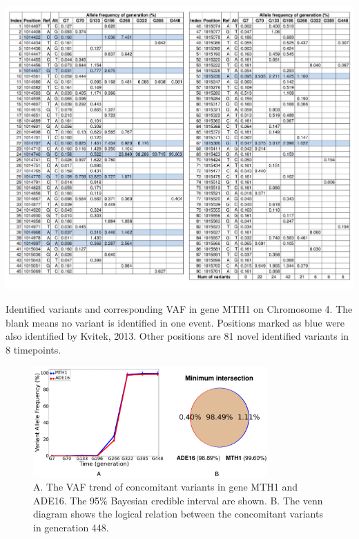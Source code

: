 \documentclass[11pt,reqno]{amsart}
\begin{document}
\begin{table}[htbp]
\centering
\includegraphics[width=1.0\textwidth]{tables/mutations_MTH1.png}
\caption{Identified variants and corresponding VAF in gene MTH1 on Chromosome 4.
The blank means no variant is identified in one event.
Positions marked as blue were also identified by Kvitek, 2013.
Other positions are 81 novel identified variants in 8 timepoints.}
\label{tbl:mutations}
\end{table}
\begin{figure}[h]
\centering
\includegraphics[width=0.8\textwidth]{figs/concomitant_figure.png}
\caption{A. The VAF trend of concomitant variants in gene MTH1 and ADE16.
The 95\% Bayesian credible interval are shown.
B. The venn diagram shows the logical relation between the concomitant variants in generation 448.}
\label{tbl:concomitant}
\end{figure}
\end{document}
